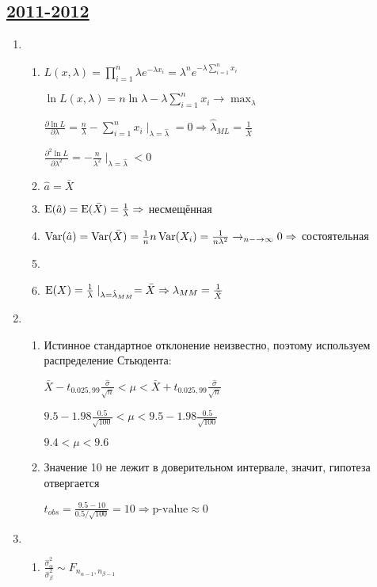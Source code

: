 
\subsection[2011-2012]{\hyperref[sec:kr_03_2011_2012]{2011-2012}}
\label{sec:sol_kr_03_2011_2012}


\begin{enumerate}
\item
\begin{enumerate}
\item $L (x, \lambda) = \prod_{i=1}^{n}\lambda e^{-\lambda x_i} = \lambda^n e^{-\lambda \sum_{i=1}^{n}x_i}$

$\ln L (x, \lambda) = n\ln\lambda - \lambda\sum_{i=1}^n x_i \to \max_\lambda$

$\frac{\partial \ln L}{\partial \lambda} = \frac{n}{\lambda} - \sum_{i=1}^{n}x_i \mid_{\lambda = \hat{\lambda}} = 0 \Rightarrow \hat{\lambda}_{ML} = \frac{1}{\bar{X}}$

$\frac{\partial^2 \ln L}{\partial \lambda^2} = -\frac{n}{\lambda^2} \mid_{\lambda=\hat{\lambda}} < 0$
\item $\hat{a} = \bar{X}$
\item $\operatorname{E}(\hat{a}) = \operatorname{E}(\bar{X}) = \frac{1}{\lambda} \Rightarrow$  несмещённая
\item $\operatorname{Var}(\hat{a}) = \operatorname{Var}(\bar{X}) = \frac{1}{n}n\operatorname{Var}(X_i) = \frac{1}{n\lambda^2} \to_{n-\to\infty} 0 \Rightarrow$ состоятельная
\item
\item $\operatorname{E}(X) = \frac{1}{\lambda} \mid_{\lambda = \hat{\lambda}_{MM}} = \bar{X} \Rightarrow \lambda_{MM} = \frac{1}{\bar{X}}$
\end{enumerate}
\item
\begin{enumerate}
\item Истинное стандартное отклонение неизвестно, поэтому используем распределение Стьюдента:

$\bar{X} - t_{0.025, 99}\frac{\hat{\sigma}}{\sqrt{n}} < \mu < \bar{X} + t_{0.025, 99}\frac{\hat{\sigma}}{\sqrt{n}}$

$9.5 - 1.98 \frac{0.5}{\sqrt{100}} < \mu < 9.5 - 1.98 \frac{0.5}{\sqrt{100}} $

$9.4 < \mu < 9.6$
\item  Значение 10 не лежит в доверительном интервале, значит, гипотеза отвергается

$t_{obs} = \frac{9.5-10}{0.5/\sqrt{100}} = 10 \Rightarrow \text{p-value} \approx 0$
\end{enumerate}
\item
\begin{enumerate}
\item $\frac{\hat{\sigma}_\alpha^2}{\hat{\sigma}_\beta^2} \sim F_{n_{\alpha-1}, n_{\beta-1}}$


\end{enumerate}
\end{enumerate}
